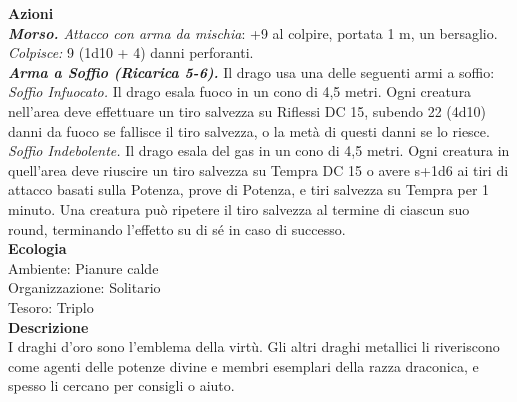 \begin{multicols}{2}
\smallskip\textbf{Azioni}\\
\emph{\textbf{Morso.} Attacco con arma da mischia}: +9 al colpire, portata 1 m, un bersaglio.\\
\emph{Colpisce:} 9 (1d10 + 4) danni perforanti.\\
\emph{\textbf{Arma a Soffio (Ricarica 5-6).}} Il drago usa una delle seguenti armi a soffio:\\
\emph{Soffio Infuocato.} Il drago esala fuoco in un cono di 4,5 metri. Ogni creatura nell'area deve effettuare un tiro salvezza su Riflessi DC  15, subendo 22 (4d10) danni da fuoco se fallisce il tiro salvezza, o la metà di questi danni se lo riesce.\\
\emph{Soffio Indebolente.} Il drago esala del gas in un cono di 4,5 metri. Ogni creatura in quell'area deve riuscire un tiro salvezza su Tempra DC  15 o avere s+1d6 ai tiri di attacco basati sulla Potenza, prove di Potenza, e tiri salvezza su Tempra per 1 minuto. Una creatura può ripetere il tiro salvezza al termine di ciascun suo round, terminando l'effetto su di sé in caso di successo.\\
\textbf{Ecologia}\\
Ambiente: Pianure calde\\
Organizzazione: Solitario\\
Tesoro: Triplo\\
\textbf{Descrizione}\\
I draghi d'oro sono l'emblema della virtù. Gli altri draghi metallici li riveriscono come agenti delle potenze divine e membri esemplari della razza draconica, e spesso li cercano per consigli o aiuto.\\


\end{multicols}
